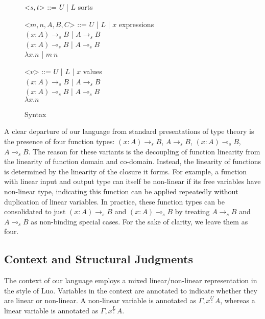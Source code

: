\documentclass{article}
\newcommand{\indalt}[1][2]{\\\hspace*{-1.2em}\textbar\quad}
\newcommand{\utype}{\overset{U}{:}}
\newcommand{\ltype}{\overset{L}{:}}
\begin{document}
  \begin{figure}[H]
    \caption{Syntax}
    \centering
    \begin{minipage}{0.8\linewidth}
    \begin{grammar}
      <$s, t$> ::= $U$ | $L$ \phantom{| $x$} \hspace*{8em} sorts

      <$m, n, A, B, C$> ::= $U$ | $L$ | $x$  \hspace*{8em} expressions
      \indalt $(x : A) \rightarrow_s B$ | $A \rightarrow_s B$
      \indalt $(x : A) \multimap_s B$ | $A \multimap_s B$
      \indalt $\lambda x. n$ | $m\ n$

      <$v$> ::= $U$ | $L$ | $x$ \hspace*{8em} values
      \indalt $(x : A) \rightarrow_s B$ | $A \rightarrow_s B$
      \indalt $(x : A) \multimap_s B$ | $A \multimap_s B$
      \indalt $\lambda x. n$
    \end{grammar}
    \end{minipage}
    \label{syntax}
  \end{figure}

  A clear departure of our language from standard presentations of type theory is the presence of four function types: $(x : A) \rightarrow_s B$, $A \rightarrow_s B$, $(x : A) \multimap_s B$, $A \multimap_s B$. The reason for these variants is the decoupling of function linearity from the linearity of function domain and co-domain. Instead, the linearity of functions is determined by the linearity of the closure it forms. For example, a function with linear input and output type can itself be non-linear if its free variables have non-linear type, indicating this function can be applied repeatedly without duplication of linear variables. In practice, these function types can be consolidated to just $(x : A) \rightarrow_s B$ and $(x : A) \multimap_s B$ by treating $A \rightarrow_s B$ and $A \multimap_s B$ as non-binding special cases. For the sake of clarity, we leave them as four.

  \subsection{Context and Structural Judgments}
  The context of our language employs a mixed linear/non-linear representation in the style of Luo\cite{luo}. Variables in the context are annotated to indicate whether they are linear or non-linear. A non-linear variable is annotated as $\Gamma, x \utype A$, whereas a linear variable is annotated as $\Gamma, x \ltype A$. 
  
\end{document}
